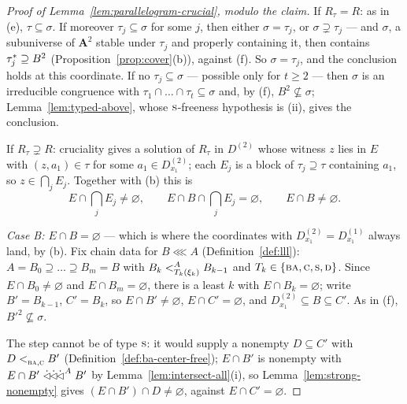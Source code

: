 \begin{proof}[Proof of Lemma~\ref{lem:parallelogram-crucial}, modulo the claim]
If $R_{\tau}=R$: as in (e), $\tau\subseteq\sigma$. If moreover
$\tau_{j}\subseteq\sigma$ for some $j$, then either $\sigma=\tau_{j}$, or
$\sigma\supsetneq\tau_{j}$ --- and $\sigma$, a subuniverse of $\mathbf A^{2}$
stable under $\tau_{j}$ and properly containing it, then contains
$\cover{\tau_{j}}\supseteq B^{2}$ (Proposition~\ref{prop:cover}(b)),
against (f). So $\sigma=\tau_{j}$, and the conclusion holds at this
coordinate. If no $\tau_{j}\subseteq\sigma$ --- possible only for $t\ge2$ ---
then $\sigma$ is an irreducible congruence with
$\tau_{1}\cap\dots\cap\tau_{t}\subseteq\sigma$ and, by (f),
$B^{2}\not\subseteq\sigma$; Lemma~\ref{lem:typed-above}, whose
$\TS$-freeness hypothesis is (ii), gives the conclusion.

If $R_{\tau}\supsetneq R$: cruciality gives a solution of $R_{\tau}$ in
$D^{(2)}$ whose witness $z$ lies in $E$ with $(z,a_{1})\in\tau$ for some
$a_{1}\in D^{(2)}_{x_{1}}$; each $E_{j}$ is a block of
$\tau_{j}\supseteq\tau$ containing $a_{1}$, so $z\in\bigcap_{j}E_{j}$.
Together with (b) this is
\begin{equation}\label{eq:config-alpha}\tag{$\alpha$}
  E\cap\textstyle\bigcap_{j}E_{j}\neq\varnothing,
  \qquad
  E\cap B\cap\textstyle\bigcap_{j}E_{j}=\varnothing,
  \qquad E\cap B\neq\varnothing .
\end{equation}

\emph{Case B: $E\cap B=\varnothing$} --- which is where the coordinates with
$D^{(2)}_{x_{1}}=D^{(1)}_{x_{1}}$ always land, by (b). Fix chain data for
$B\lll A$ (Definition~\ref{def:lll}): $A=B_{0}\supseteq\dots\supseteq
B_{m}=B$ with $B_{k}\subt[A]{T_{k}(\xi_{k})}B_{k-1}$ and
$T_{k}\in\{\TBA,\TC,\TS,\TD\}$. Since $E\cap B_{0}\neq\varnothing$ and
$E\cap B_{m}=\varnothing$, there is a least $k$ with $E\cap B_{k}=
\varnothing$; write $B'=B_{k-1}$, $C'=B_{k}$, so $E\cap B'\neq\varnothing$,
$E\cap C'=\varnothing$, and $D^{(2)}_{x_{1}}\subseteq B\subseteq C'$. As in
(f), $B'^{2}\not\subseteq\sigma$.

The step cannot be of type $\TS$: it would supply a nonempty
$D\subseteq C'$ with $D\subt{\TBA,\TC}B'$
(Definition~\ref{def:ba-center-free}); $E\cap B'$ is nonempty with
$E\cap B'\dlll^{A}B'$ by Lemma~\ref{lem:intersect-all}(i), so
Lemma~\ref{lem:strong-nonempty} gives $(E\cap B')\cap D\neq\varnothing$,
against $E\cap C'=\varnothing$.


\end{proof}
